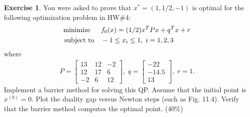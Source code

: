 \documentclass[12pt]{extarticle}
\theoremstyle{definition}
\newtheorem{exercise}{Exercise}
\begin{document}
\newpage
\begin{exercise}
  You were asked to prove that $x^\ast=(1,1/2,-1)$ is optimal for the following optimization problem in HW\#4:
  \begin{align*}
    \text{minimize\;\;}\quad& f_0(x)=(1/2)x^TPx+q^Tx+r\\
    \text{subject to}  \quad& -1\le x_i \le 1,\;i=1,2,3
  \end{align*}
  where
  \begin{align*}
    P= \begin{bmatrix}13&12&-2\\12&17&6\\-2&6&12\end{bmatrix},\;
    q= \begin{bmatrix}-22\\-14.5\\13\end{bmatrix},\;
    r= 1.
  \end{align*}
  Implement a barrier method for solving this QP.
  Assume that the initial point is $x^{(0)}=0$.
  Plot the duality gap versus Newton steps (such as Fig. 11.4).
  Verify that the barrier method computes the optimal point. (40\%)
\end{exercise}
\end{document}
